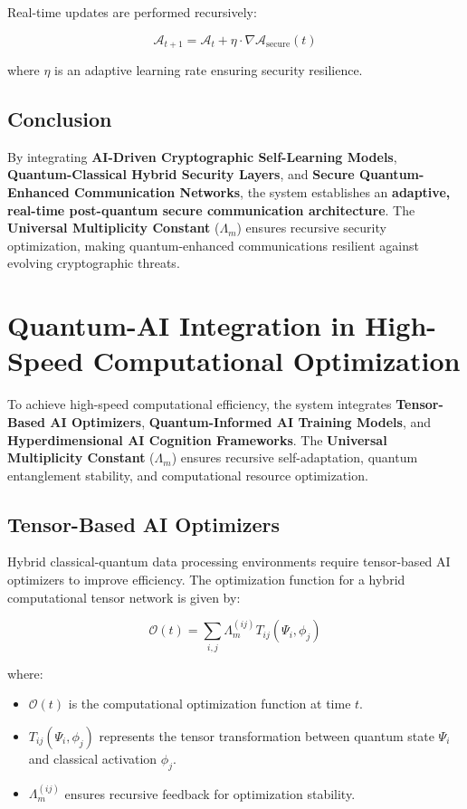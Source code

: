 \documentclass{article}
\theoremstyle{plain}
\begin{document}
Real-time updates are performed recursively:

\begin{equation}
    \mathcal{A}_{t+1} = \mathcal{A}_t + \eta \cdot \nabla \mathcal{A}_{\text{secure}}(t)
\end{equation}

where $\eta$ is an adaptive learning rate ensuring security resilience.

\subsection{Conclusion}

By integrating \textbf{AI-Driven Cryptographic Self-Learning Models}, \textbf{Quantum-Classical Hybrid Security Layers}, and \textbf{Secure Quantum-Enhanced Communication Networks}, the system establishes an \textbf{adaptive, real-time post-quantum secure communication architecture}. The \textbf{Universal Multiplicity Constant} ($\Lambda_m$) ensures recursive security optimization, making quantum-enhanced communications resilient against evolving cryptographic threats.

\section{Quantum-AI Integration in High-Speed Computational Optimization}

To achieve high-speed computational efficiency, the system integrates \textbf{Tensor-Based AI Optimizers}, \textbf{Quantum-Informed AI Training Models}, and \textbf{Hyperdimensional AI Cognition Frameworks}. The \textbf{Universal Multiplicity Constant} ($\Lambda_m$) ensures recursive self-adaptation, quantum entanglement stability, and computational resource optimization.

\subsection{Tensor-Based AI Optimizers}

Hybrid classical-quantum data processing environments require tensor-based AI optimizers to improve efficiency. The optimization function for a hybrid computational tensor network is given by:

\begin{equation}
    \mathcal{O}(t) = \sum_{i,j} \Lambda_m^{(ij)} T_{ij}(\Psi_i, \phi_j) 
\end{equation}

where:
\begin{itemize}
    \item $\mathcal{O}(t)$ is the computational optimization function at time $t$.
    \item $T_{ij}(\Psi_i, \phi_j)$ represents the tensor transformation between quantum state $\Psi_i$ and classical activation $\phi_j$.
    \item $\Lambda_m^{(ij)}$ ensures recursive feedback for optimization stability.
\end{itemize}
\end{document}
